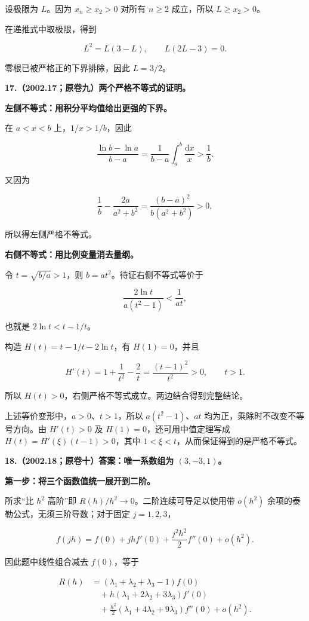 \documentclass[UTF8,11pt,fontset=windows]{ctexart}
\begin{document}
设极限为 $L$。因为 $x_n\ge x_2>0$ 对所有 $n\ge2$ 成立，所以 $L\ge x_2>0$。

在递推式中取极限，得到

$$
L^2=L(3-L),\qquad L(2L-3)=0.
$$

零根已被严格正的下界排除，因此 $L=3/2$。

\clearpage

\textbf{17.（2002.17；原卷九）两个严格不等式的证明。}

\textbf{左侧不等式：用积分平均值给出更强的下界。}

在 $a<x<b$ 上，$1/x>1/b$，因此

$$
\frac{\ln b-\ln a}{b-a}
=\frac1{b-a}\int_a^b\frac{\mathrm dx}{x}>\frac1b.
$$

又因为

$$
\frac1b-\frac{2a}{a^2+b^2}
=\frac{(b-a)^2}{b(a^2+b^2)}>0,
$$

所以得左侧严格不等式。

\textbf{右侧不等式：用比例变量消去量纲。}

令 $t=\sqrt{b/a}>1$，则 $b=at^2$。待证右侧不等式等价于

$$
\frac{2\ln t}{a(t^2-1)}<\frac1{at},
$$

也就是 $2\ln t<t-1/t$。

构造 $H(t)=t-1/t-2\ln t$，有 $H(1)=0$，并且

$$
H'(t)=1+\frac1{t^2}-\frac2t=\frac{(t-1)^2}{t^2}>0,
\qquad t>1.
$$

所以 $H(t)>0$，右侧严格不等式成立。两边结合得到完整结论。

上述等价变形中，$a>0$、$t>1$，所以 $a(t^2-1)$、$at$ 均为正，乘除时不改变不等号方向。由 $H'(t)>0$ 及 $H(1)=0$，还可用中值定理写成 $H(t)=H'(\xi)(t-1)>0$，其中 $1<\xi<t$，从而保证得到的是严格不等式。

\clearpage

\textbf{18.（2002.18；原卷十）答案：唯一系数组为 $(3,-3,1)$。}

\textbf{第一步：将三个函数值统一展开到二阶。}

所求“比 $h^2$ 高阶”即 $R(h)/h^2\to0$。二阶连续可导足以使用带 $o(h^2)$ 余项的泰勒公式，无须三阶导数；对于固定 $j=1,2,3$，

$$
f(jh)=f(0)+jhf'(0)+\frac{j^2h^2}{2}f''(0)+o(h^2).
$$

因此题中线性组合减去 $f(0)$，等于

$$
\begin{aligned}
R(h)&=(\lambda_1+\lambda_2+\lambda_3-1)f(0)\\
&\quad+h(\lambda_1+2\lambda_2+3\lambda_3)f'(0)\\
&\quad+\frac{h^2}{2}(\lambda_1+4\lambda_2+9\lambda_3)f''(0)+o(h^2).
\end{aligned}
$$
\end{document}
